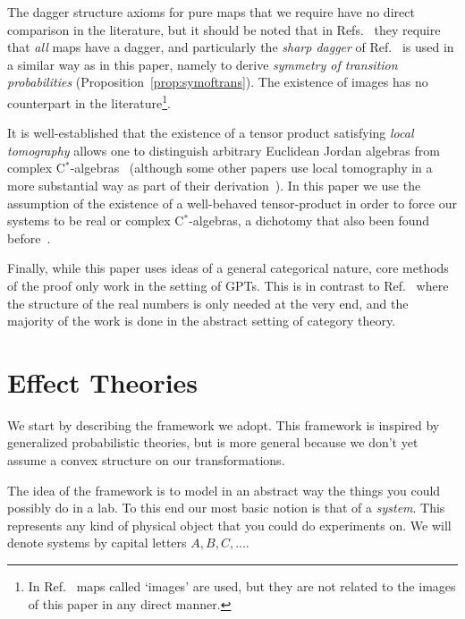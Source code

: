 \documentclass[b5paper,onecolumn,12pt,accepted=2019-05-03, issue=1, volume=1, shorttitle=papers/compositionality-1-1]{compositionalityarticle}
\newcounter{counter}
\numberwithin{counter}{section}
\begin{document}
The dagger structure axioms for pure maps that we require have no direct comparison in the literature, but it should be noted that in Refs.~\cite{tull2016reconstruction,selby2018reconstructing} they require that \emph{all} maps have a dagger, and particularly the \emph{sharp dagger} of Ref.~\cite{selby2018reconstructing} is used in a similar way as in this paper, namely to derive \emph{symmetry of transition probabilities} (Proposition~\ref{prop:symoftrans}). The existence of images has no counterpart in the literature\footnote{In Ref.~\cite{tull2016reconstruction} maps called `images' are used, but they are not related to the images of this paper in any direct manner.}.

It is well-established that the existence of a tensor product satisfying \emph{local tomography} allows one to distinguish arbitrary Euclidean Jordan algebras from complex C$^*$-algebras~\cite{tull2016reconstruction,selby2018reconstructing,hohn2017toolbox,wilce2018royal,wetering2018sequential} (although some other papers use local tomography in a more substantial way as part of their derivation~\cite{hardy2001quantum,chiribella2011informational}). In this paper we use the assumption of the existence of a well-behaved tensor-product in order to force our systems to be real or complex C$^*$-algebras, a dichotomy that also been found before~\cite{hanche1985jb,barnum2016composites}.

Finally, while this paper uses ideas of a general categorical nature, core methods of the proof only work in the setting of GPTs. This is in contrast to Ref.~\cite{tull2016reconstruction} where the structure of the real numbers is only needed at the very end, and the majority of the work is done in the abstract setting of category theory.



\section{Effect Theories}\label{sec:framework}
We start by describing the framework we adopt. This framework is inspired by generalized probabilistic theories, but is more general because we don't yet assume a convex structure on our transformations.

The idea of the framework is to model in an abstract way the things you could possibly do in a lab. To this end our most basic notion is that of a \emph{system}. This represents any kind of physical object that you could do experiments on. We will denote systems by capital letters $A,B,C,\ldots$.
\end{document}
